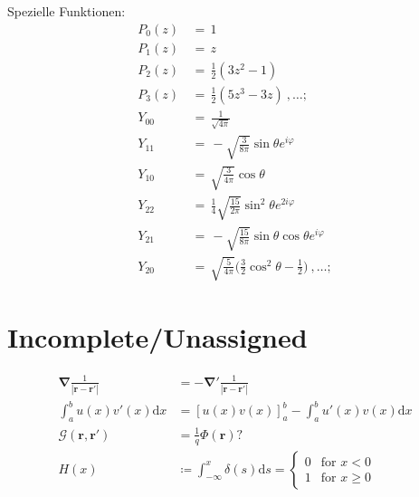 \documentclass[titlepage,11pt,a4paper,ngerman]{report}
\renewcommand{\vec}[1]{\boldsymbol{#1}}
\newcommand{\vabla}{\boldsymbol{\nabla}}
\begin{document}
\noindent
Spezielle Funktionen:
\begin{align*}
P_0(z)\,&=\,1\\
P_1(z)\,&=\,z\\
P_2(z)\,&=\,\frac{1}{2}(3z^2-1)\\
P_3(z)\,&=\,\frac{1}{2}(5z^3-3z)\ ,\dots;\\
Y_{00}\,&=\,\frac{1}{\sqrt{4\pi}}\\
Y_{11}\,&=\,-\sqrt{\frac{3}{8\pi}}\sin\theta e^{i\varphi}\\
Y_{10}\,&=\,\sqrt{\frac{3}{4\pi}}\cos\theta\\
Y_{22}\,&=\,\frac{1}{4}\sqrt{\frac{15}{2\pi}}\sin^2\theta e^{2i\varphi}\\
Y_{21}\,&=\,-\sqrt{\frac{15}{8\pi}}\sin\theta\cos\theta e^{i\varphi}\\
Y_{20}\,&=\,\sqrt{\frac{5}{4\pi}}\Bigg(\frac{3}{2}\cos^2\theta-\frac{1}{2}\Bigg)\ ,\dots;
\end{align*}




\newpage
\section{Incomplete/Unassigned}
\begin{align*}
\vabla\frac{1}{|\vec{r}-\vec{r}'|}&=-\vabla'\frac{1}{|\vec{r}-\vec{r}'|}\\
\int_a^bu(x)v'(x)\mathrm{d}x&=[u(x)v(x)]_a^b-\int_a^bu'(x)v(x)\mathrm{d}x\\
\mathcal{G}(\vec{r},\vec{r}')&=\frac{1}{q}\Phi(\vec{r})?\\
H(x)&\coloneqq\int_{-\infty}^x\delta(s)\mathrm{d}s=\begin{cases}0&\textrm{for }x<0\\1&\textrm{for }x\geq0\end{cases}
\end{align*}
\end{document}
